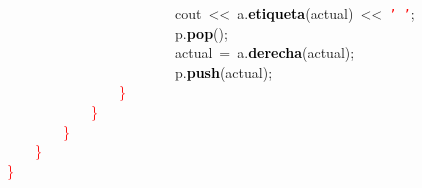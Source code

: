 \mbox{}\ \ \ \ \ \ \ \ \ \ \ \ \ \ \ \ \ \ \ \ \ \ \ \ cout\ \textcolor{BrickRed}{\textless{}\textless{}}\ a\textcolor{BrickRed}{.}\textbf{\textcolor{Black}{etiqueta}}\textcolor{BrickRed}{(}actual\textcolor{BrickRed}{)}\ \textcolor{BrickRed}{\textless{}\textless{}}\ \texttt{\textcolor{Red}{'\ '}}\textcolor{BrickRed}{;} \\
\mbox{}\ \ \ \ \ \ \ \ \ \ \ \ \ \ \ \ \ \ \ \ \ \ \ \ p\textcolor{BrickRed}{.}\textbf{\textcolor{Black}{pop}}\textcolor{BrickRed}{();} \\
\mbox{}\ \ \ \ \ \ \ \ \ \ \ \ \ \ \ \ \ \ \ \ \ \ \ \ actual\ \textcolor{BrickRed}{=}\ a\textcolor{BrickRed}{.}\textbf{\textcolor{Black}{derecha}}\textcolor{BrickRed}{(}actual\textcolor{BrickRed}{);} \\
\mbox{}\ \ \ \ \ \ \ \ \ \ \ \ \ \ \ \ \ \ \ \ \ \ \ \ p\textcolor{BrickRed}{.}\textbf{\textcolor{Black}{push}}\textcolor{BrickRed}{(}actual\textcolor{BrickRed}{);} \\
\mbox{}\ \ \ \ \ \ \ \ \ \ \ \ \ \ \ \ \textcolor{Red}{\}} \\
\mbox{}\ \ \ \ \ \ \ \ \ \ \ \ \textcolor{Red}{\}} \\
\mbox{}\ \ \ \ \ \ \ \ \textcolor{Red}{\}} \\
\mbox{}\ \ \ \ \textcolor{Red}{\}} \\
\mbox{}\textcolor{Red}{\}}
